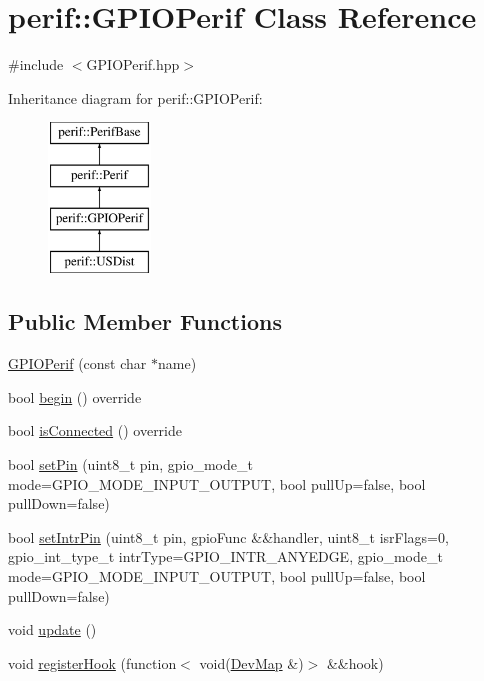 \hypertarget{classperif_1_1GPIOPerif}{}\section{perif\+::G\+P\+I\+O\+Perif Class Reference}
\label{classperif_1_1GPIOPerif}


{\ttfamily \#include $<$G\+P\+I\+O\+Perif.\+hpp$>$}

Inheritance diagram for perif\+::G\+P\+I\+O\+Perif\+:\begin{figure}[H]
\begin{center}
\leavevmode
\includegraphics[height=4.000000cm]{classperif_1_1GPIOPerif}
\end{center}
\end{figure}
\subsection*{Public Member Functions}
\begin{DoxyCompactItemize}
\item 
\mbox{\hyperlink{classperif_1_1GPIOPerif_a8a96ad56b51e9c46115bb8320e1c268d}{G\+P\+I\+O\+Perif}} (const char $\ast$name)
\item 
bool \mbox{\hyperlink{classperif_1_1GPIOPerif_a3e94e58e8441b85256567c193164ea69}{begin}} () override
\item 
bool \mbox{\hyperlink{classperif_1_1GPIOPerif_ae7c93b409fd4d4d49f9f8eddae612b3e}{is\+Connected}} () override
\item 
bool \mbox{\hyperlink{classperif_1_1GPIOPerif_a4edf4acd2bcdbe870efb96f8dcd7940a}{set\+Pin}} (uint8\+\_\+t pin, gpio\+\_\+mode\+\_\+t mode=G\+P\+I\+O\+\_\+\+M\+O\+D\+E\+\_\+\+I\+N\+P\+U\+T\+\_\+\+O\+U\+T\+P\+UT, bool pull\+Up=false, bool pull\+Down=false)
\item 
bool \mbox{\hyperlink{classperif_1_1GPIOPerif_a9e1f4a1d4aa01d0bc01d9a371a52dd5c}{set\+Intr\+Pin}} (uint8\+\_\+t pin, gpio\+Func \&\&handler, uint8\+\_\+t isr\+Flags=0, gpio\+\_\+int\+\_\+type\+\_\+t intr\+Type=G\+P\+I\+O\+\_\+\+I\+N\+T\+R\+\_\+\+A\+N\+Y\+E\+D\+GE, gpio\+\_\+mode\+\_\+t mode=G\+P\+I\+O\+\_\+\+M\+O\+D\+E\+\_\+\+I\+N\+P\+U\+T\+\_\+\+O\+U\+T\+P\+UT, bool pull\+Up=false, bool pull\+Down=false)
\item 
void \mbox{\hyperlink{classperif_1_1Perif_ad6fe1a13354bba4af4cc2751399ed93c}{update}} ()
\item 
void \mbox{\hyperlink{classperif_1_1PerifBase_a2e8bcc221ee253b21b61c7c07307d931}{register\+Hook}} (function$<$ void(\mbox{\hyperlink{Perif_8hpp_a358ff4ee6d24694ee7661f0cce14377e}{Dev\+Map}} \&)$>$ \&\&hook)
\end{DoxyCompactItemize}
